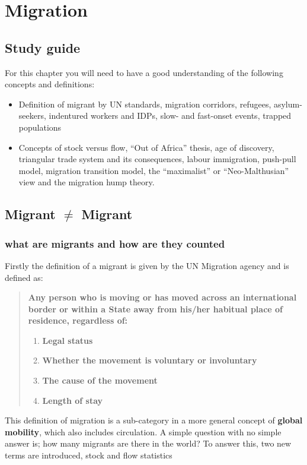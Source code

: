 \documentclass[../summary.tex]{subfiles}
\begin{document}
\section{Migration}

\subsection{Study guide}
For this chapter you will need to have a good understanding of the following concepts and definitions:
\begin{itemize}
	\item Definition of migrant by UN standards, migration corridors, refugees, asylum-seekers, indentured workers and IDPs, slow- and fast-onset events, trapped populations
	\item Concepts of stock versus flow, ``Out of Africa'' thesis, age of discovery, triangular trade system and its consequences, labour immigration, push-pull model, migration transition model, the ``maximalist'' or ``Neo-Malthusian'' view and the migration hump theory.
\end{itemize}

\subsection{Migrant $\neq$ Migrant}
\subsubsection{what are migrants and how are they counted}
Firstly the definition of a migrant is given by the UN Migration agency and is defined as:
\begin{quote}
	\textbf{Any person who is moving or has moved across an international border or within a State away from his/her habitual place of residence, regardless of:}
	\begin{enumerate}
		\item \textbf{Legal status}
		\item \textbf{Whether the movement is voluntary or involuntary}
		\item \textbf{The cause of the movement}
		\item \textbf{Length of stay}
	\end{enumerate}
\end{quote}
This definition of migration is a sub-category in a more general concept of \textbf{global mobility}, which also includes circulation. A simple question with no simple answer is; how many migrants are there in the world? To answer this, two new terms are introduced, stock and flow statistics
\end{document}
